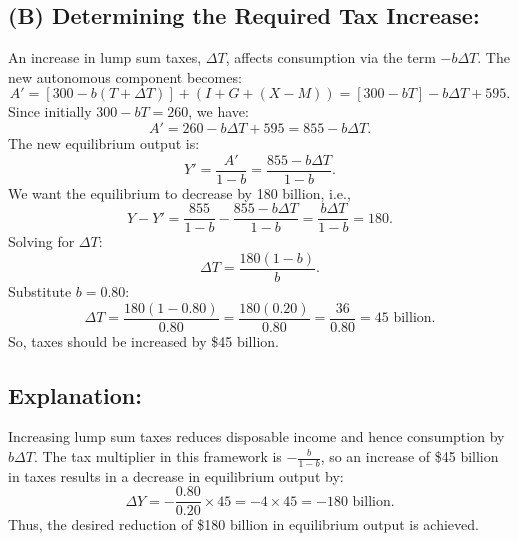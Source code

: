 \documentclass{article}
\begin{document}
\subsection*{(B) Determining the Required Tax Increase:}
An increase in lump sum taxes, \(\Delta T\), affects consumption via the term \(-b\Delta T\). The new autonomous component becomes:
\[
  A' = \left[300 - b(T+\Delta T)\right] + (I+G+(X-M)) = \left[300 - bT\right] - b\Delta T + 595.
\]
Since initially \(300 - bT = 260\), we have:
\[
  A' = 260 - b\Delta T + 595 = 855 - b\Delta T.
\]
The new equilibrium output is:
\[
  Y' = \frac{A'}{1-b} = \frac{855 - b\Delta T}{1-b}.
\]
We want the equilibrium to decrease by 180 billion, i.e.,
\[
  Y - Y' = \frac{855}{1-b} - \frac{855 - b\Delta T}{1-b} = \frac{b\Delta T}{1-b} = 180.
\]
Solving for \(\Delta T\):
\[
  \Delta T = \frac{180(1-b)}{b}.
\]
Substitute \(b=0.80\):
\[
  \Delta T = \frac{180(1-0.80)}{0.80} = \frac{180(0.20)}{0.80} = \frac{36}{0.80} = 45\text{ billion}.
\]
So, taxes should be increased by \$45 billion.

\subsection*{Explanation:}
Increasing lump sum taxes reduces disposable income and hence consumption by \(b\Delta T\). The tax multiplier in this framework is \(-\frac{b}{1-b}\), so an increase of \$45 billion in taxes results in a decrease in equilibrium output by:
\[
  \Delta Y = -\frac{0.80}{0.20} \times 45 = -4 \times 45 = -180\text{ billion}.
\]
Thus, the desired reduction of \$180 billion in equilibrium output is achieved.
\end{document}

